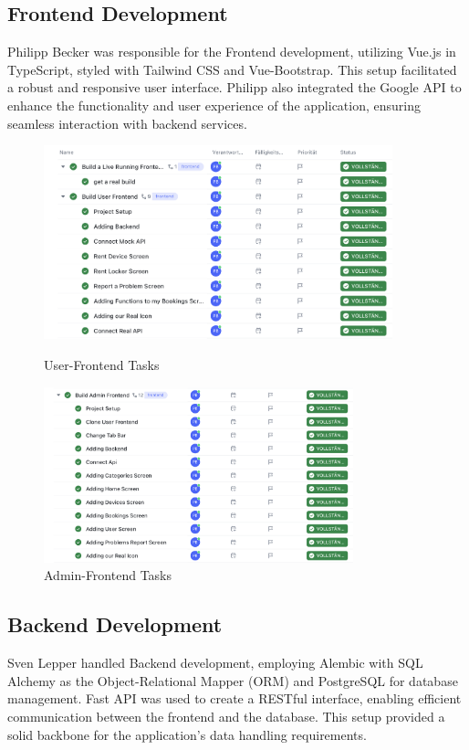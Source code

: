 \subsection{Frontend Development}
Philipp Becker was responsible for the Frontend development, utilizing Vue.js in TypeScript, styled with Tailwind CSS and Vue-Bootstrap. This setup facilitated a robust and responsive user interface. Philipp also integrated the Google API to enhance the functionality and user experience of the application, ensuring seamless interaction with backend services.
\begin{figure}[htbp]
    \centering
    \includegraphics[width=0.9\textwidth]{images/user-frontend.png}
    \caption{User-Frontend Tasks}
    \label{fig:myimage}
    \vspace{1cm}
    \includegraphics[width=0.8\textwidth]{images/admin-frontend.png}
    \caption{Admin-Frontend Tasks}
    \label{fig:myimage}
\end{figure}
\clearpage
\subsection{Backend Development}
Sven Lepper handled Backend development, employing Alembic with SQL Alchemy as the Object-Relational Mapper (ORM) and PostgreSQL for database management. Fast API was used to create a RESTful interface, enabling efficient communication between the frontend and the database. This setup provided a solid backbone for the application's data handling requirements.

